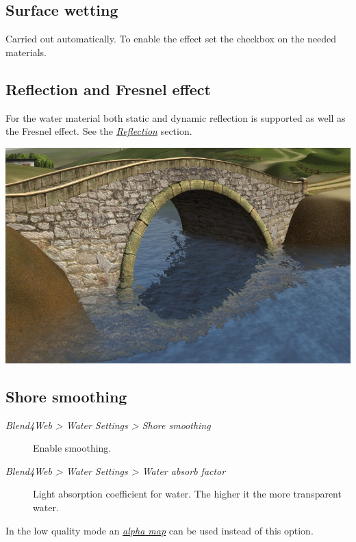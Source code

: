 \documentclass[a4paper,12pt,oneside]{sphinxmanual}
\begin{document}
\subsection{Surface wetting}
\label{outdoor_rendering:id6}
Carried out automatically. To enable the effect set the  checkbox on the needed materials.


\subsection{Reflection and Fresnel effect}
\label{outdoor_rendering:id7}
For the water material both static and dynamic reflection is supported as well as the Fresnel effect. See the {\hyperref[materials:material-mirror]{\emph{Reflection}}} section.

{\hfill\includegraphics[width=1.000\linewidth]{water_reflection_dynamic.jpg}\hfill}


\subsection{Shore smoothing}
\label{outdoor_rendering:id8}\begin{description}
\item[{\emph{Blend4Web \textgreater{} Water Settings \textgreater{} Shore smoothing}}] \leavevmode
Enable smoothing.

\item[{\emph{Blend4Web \textgreater{} Water Settings \textgreater{} Water absorb factor}}] \leavevmode
Light absorption coefficient for water. The higher it the more transparent water.

\end{description}

In the low quality mode an {\hyperref[textures:texture-alpha-map]{\emph{alpha map}}} can be used instead of this option.
\end{document}
